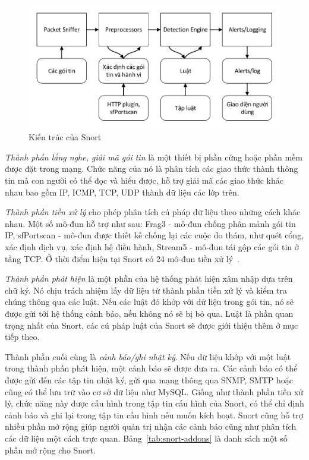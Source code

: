 \begin{figure}[H]
    \centering
    \includegraphics[width=1.0\textwidth]{snort-architecture}
    \caption{
        \label{fig:snort-architecture}
        Kiến trúc của Snort}
\end{figure}

\emph{Thành phần lắng nghe, giải mã gói tin} là một thiết bị phần cứng hoặc phần mềm được đặt trong mạng. Chức năng của nó là phân tích các giao thức thành thông tin mà con người có thể đọc và hiểu được, hỗ trợ giải mã các giao thức khác nhau bao gồm IP, ICMP, TCP, UDP thành dữ liệu các lớp trên.

\emph{Thành phần tiền xử lý} cho phép phân tích cú pháp dữ liệu theo những cách khác nhau. Một số mô-đun hỗ trợ như sau: Frag3 - mô-đun chống phân mảnh gói tin IP, sfPortscan - mô-đun được thiết kế chống lại các cuộc do thám, như quét cổng, xác định dịch vụ, xác định hệ điều hành, Stream5 - mô-đun tái gộp các gói tin ở tầng TCP. Ở thời điểm hiện tại Snort có 24 mô-đun tiền xử lý~\cite{caswell2007snort}.

\emph{Thành phần phát hiện} là một phần của hệ thống phát hiện xâm nhập dựa trên chữ ký. Nó chịu trách nhiệm lấy dữ liệu từ thành phần tiền xử lý và kiểm tra chúng thông qua các luật. Nếu các luật đó khớp với dữ liệu trong gói tin, nó sẽ được gửi tới hệ thống cảnh báo, nếu không nó sẽ bị bỏ qua. Luật là phần quan trọng nhất của Snort, các cú pháp luật của Snort sẽ được giới thiệu thêm ở mục tiếp theo.

Thành phần cuối cùng là \emph{cảnh báo/ghi nhật ký}. Nếu dữ liệu khớp với một luật trong thành phần phát hiện, một cảnh báo sẽ được đưa ra. Các cảnh báo có thể được gửi đến các tập tin nhật ký, gửi qua mạng thông qua SNMP, SMTP hoặc cũng có thể lưu trữ vào cơ sở dữ liệu như MySQL. Giống như thành phần tiền xử lý, chức năng này được cấu hình trong tập tin cấu hình của Snort, có thể chỉ định cảnh báo và ghi lại trong tập tin cấu hình nếu muốn kích hoạt. Snort cũng hỗ trợ nhiều phần mở rộng giúp người quản trị nhận các cảnh báo cũng như phân tích các dữ liệu một cách trực quan. Bảng~\ref{tab:snort-addons} là danh sách một số phần mở rộng cho Snort.

